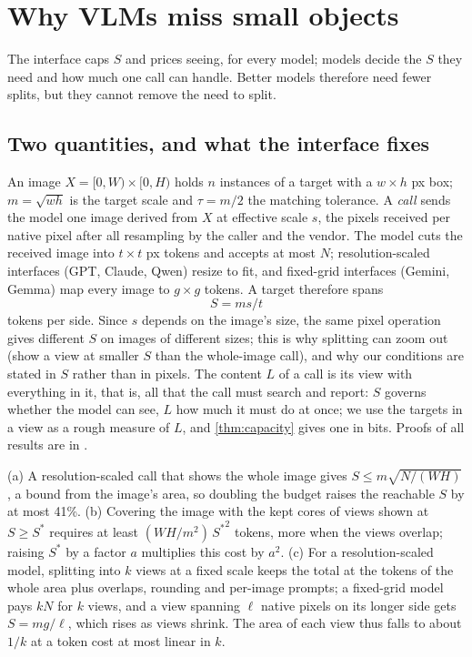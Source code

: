 \section{Why VLMs miss small objects}
\label{sec:why}

The interface caps $S$ and prices seeing, for every model; models decide the $S$ they need and how much one call can handle. Better models therefore need fewer splits, but they cannot remove the need to split.

\subsection{Two quantities, and what the interface fixes}

An image $X = [0,W) \times [0,H)$ holds $n$ instances of a target with a $w \times h$ px box; $m = \sqrt{wh}$ is the target scale and $\tau = m/2$ the matching tolerance. A \emph{call} sends the model one image derived from $X$ at effective scale $s$, the pixels received per native pixel after all resampling by the caller and the vendor. The model cuts the received image into $t \times t$ px tokens and accepts at most $N$; resolution-scaled interfaces (GPT, Claude, Qwen) resize to fit, and fixed-grid interfaces (Gemini, Gemma) map every image to $g \times g$ tokens. A target therefore spans
\begin{equation}
S = m s / t
\label{eq:S}
\end{equation}
tokens per side. Since $s$ depends on the image's size, the same pixel operation gives different $S$ on images of different sizes; this is why splitting can zoom out (show a view at smaller $S$ than the whole-image call), and why our conditions are stated in $S$ rather than in pixels. The content $L$ of a call is its view with everything in it, that is, all that the call must search and report: $S$ governs whether the model can see, $L$ how much it must do at once; we use the targets in a view as a rough measure of $L$, and \cref{thm:capacity} gives one in bits. Proofs of all results are in .

\begin{proposition}
\label{prop:geometry}
(a) A resolution-scaled call that shows the whole image gives $S \le m\sqrt{N/(WH)}$, a bound from the image's area, so doubling the budget raises the reachable $S$ by at most 41\%. (b) Covering the image with the kept cores of views shown at $S \ge S^\ast$ requires at least $(WH/m^2)\,{S^\ast}^2$ tokens, more when the views overlap; raising $S^\ast$ by a factor $a$ multiplies this cost by $a^2$. (c) For a resolution-scaled model, splitting into $k$ views at a fixed scale keeps the total at the tokens of the whole area plus overlaps, rounding and per-image prompts; a fixed-grid model pays $kN$ for $k$ views, and a view spanning $\ell$ native pixels on its longer side gets $S = mg/\ell$, which rises as views shrink. The area of each view thus falls to about $1/k$ at a token cost at most linear in $k$.
\end{proposition}

